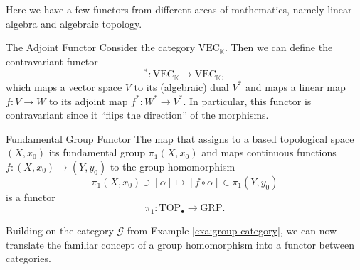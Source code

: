 Here we have a few functors from different areas of mathematics, namely linear algebra and algebraic topology.

\begin{example}{The Adjoint Functor \cite[Ex.~1.2.12]{Leinster2014-dc}}{}
Consider the category $\mathrm{VEC}_\mathbb{K}$. Then we can define the contravariant functor
$$
^* \colon \mathrm{VEC}_\mathbb{K} \to \mathrm{VEC}_\mathbb{K},
$$
which maps a vector space $V$ to its (algebraic) dual $V^*$ and maps a linear map $f\colon V \to W$ to its adjoint map $f^*\colon W^* \to V^*$. In particular, this functor is contravariant since it ``flips the direction'' of the morphisms.
\end{example}


\begin{example}{Fundamental Group Functor \cite[Ex.~1.2.5]{Leinster2014-dc}}{}
The map that assigns to a based topological space $(X,x_0)$ its fundamental group $\pi_1(X,x_0)$ and maps continuous functions $f\colon (X,x_0) \to (Y,y_0)$ to the group homomorphism 
$$
\pi_1(X,x_0) \ni [\alpha] \mapsto [f \circ \alpha] \in \pi_1(Y,y_0)
$$
is a functor
$$
\pi_1\colon \mathrm{TOP}_\bullet \to \mathrm{GRP}.
$$
\end{example}


Building on the category $\mathcal{G}$ from Example \ref{exa:group-category}, we can now translate the familiar concept of a group homomorphism into a functor between categories.

